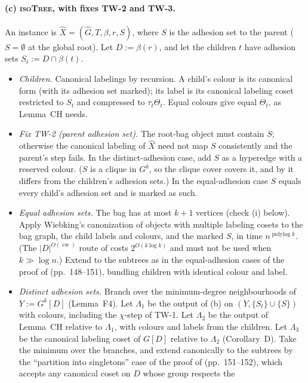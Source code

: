 \documentclass[11pt]{article}
\theoremstyle{plain}
\theoremstyle{definition}
\theoremstyle{remark}
\theoremstyle{named}
\theoremstyle{namedrm}
\newcommand{\cw}{\operatorname{cw}}
\newcommand{\polylog}{\operatorname{polylog}}
\begin{document}
\paragraph{(c) \textsc{isoTree}, with fixes TW-2 and TW-3.} An instance is
$\hat X=(\hat G,T,\beta,r,S)$, where $S$ is the adhesion set to the parent ($S=\emptyset$ at the global root). Let
$D:=\beta(r)$, and let the children $t$ have adhesion sets $S_t:=D\cap\beta(t)$.
\begin{itemize}
\item \emph{Children.} Canonical labelings by recursion. A child's colour is its canonical form (with its
  adhesion set marked); its label is its canonical labeling coset restricted to $S_t$ and compressed to
  $\tau_t\Theta_t$. Equal colours give equal $\Theta_t$, as Lemma~CH needs.
\item \emph{Fix TW-2 (parent adhesion set).} The root-bag object must contain $S$; otherwise the
  canonical labeling of $\hat X$ need not map $S$ consistently and the parent's step fails. In the
  distinct-adhesion case, add $S$ as a hyperedge with a reserved colour. ($S$ is a clique in $G^k$, so the
  clique cover covers it, and by \cite[Thm.~30(3)]{Wie20} it differs from the children's adhesion sets.) In
  the equal-adhesion case $S$ equals every child's adhesion set and is marked as such.
\item \emph{Equal adhesion sets.} The bag has at most $k+1$ vertices (check (i) below). Apply Wiebking's
  canonization of objects with multiple labeling cosets \cite[Cor.~27]{Wie20} to the bag graph, the child
  labels and colours, and the marked $S$, in time $n^{\polylog k}$. (The $|D|^{O(\cw)}$ route of
  \cite[Thm.~6.11]{Wie21} costs $2^{O(k\log k)}$ and must not be used when $k\gg\log n$.) Extend to the
  subtrees as in the equal-adhesion cases of the proof of \cite[Thm.~6.11]{Wie21} (pp.~148--151), bundling
  children with identical colour and label.
\item \emph{Distinct adhesion sets.} Branch over the minimum-degree neighbourhoods of $Y:=G^k[D]$ (Lemma~F4).
  Let $\Lambda_1$ be the output of (b) on $(Y,\{S_t\}\cup\{S\})$ with colours, including the $\chi$-step of TW-1. Let
  $\Lambda_2$ be the output of Lemma~CH relative to $\Lambda_1$, with colours and labels from the children. Let $\Lambda_3$
  be the canonical labeling coset of $G[D]$ relative to $\Lambda_2$ (Corollary~D). Take the minimum over the
  branches, and extend canonically to the subtrees by the ``partition into singletons'' case of the proof of
  \cite[Thm.~6.11]{Wie21} (pp.~151--152), which accepts any canonical coset on $D$ whose group respects the

\end{itemize}
\end{document}
